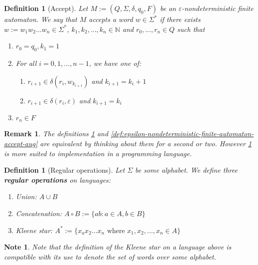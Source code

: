 \documentclass{article}
\theoremstyle{break}
\newtheorem{definition}[theorem]{Definition}
\newtheorem{note}[theorem]{Note}
\newtheorem*{remark}{Remark}
\begin{document}
\begin{definition}[Accept]
  \label{def:epsilon-nondeterministic-finite-automaton-accept}
  Let $M:=(Q,\Sigma,\delta,q_0,F)$ be an $\varepsilon$-nondeterministic finite automaton.
  We say that $M$ accepts a word $w \in \Sigma^*$ if there exists $w:=w_1w_2\ldots w_n \in\Sigma^*$, $k_1, k_2, \ldots, k_n \in \mathbb{N}$ and $r_0,\ldots,r_n\in Q$ such that
    \begin{enumerate}
      \item $r_0=q_0, k_1=1$
      \item For all $i = 0,1,\ldots, n-1$, we have one of:
      \begin{enumerate}
        \item $r_{i+1} \in \delta(r_i, w_{k_{i+1}})$ and $k_{i+1}=k_i+1$
        \item $r_{i+1} \in \delta(r_i, \varepsilon)$ and $k_{i+1}=k_i$
      \end{enumerate}
      \item $r_n\in F$
    \end{enumerate}
\end{definition}

\begin{remark}
  The definitions \ref{def:epsilon-nondeterministic-finite-automaton-accept} and \ref{def:epsilon-nondeterministic-finite-automaton-accept-aug} are equivalent by thinking about them for a second or two.
  However \ref{def:epsilon-nondeterministic-finite-automaton-accept} is more suited to implementation in a programming language.
\end{remark}

\begin{definition}[Regular operations]
\label{def:regular-operation}
Let $\Sigma$ be some alphabet. 
We define three \textbf{regular operations} on languages:
\begin{enumerate}
  \item Union: $A \cup B$
  \item Concatenation: $A \circ B := \{ab: a\in A, b\in B\}$
  \item Kleene star: $A^* :=\{x_ax_2\ldots x_n \text{ where } x_1,x_2,\ldots,x_n\in A\}$
\end{enumerate}
\end{definition}

\begin{note}
\label{note:Kleene-star-compatible}
Note that the definition of the Kleene star on a language above is compatible with its use to denote the set of words over some alphabet.
\end{note}
\end{document}
